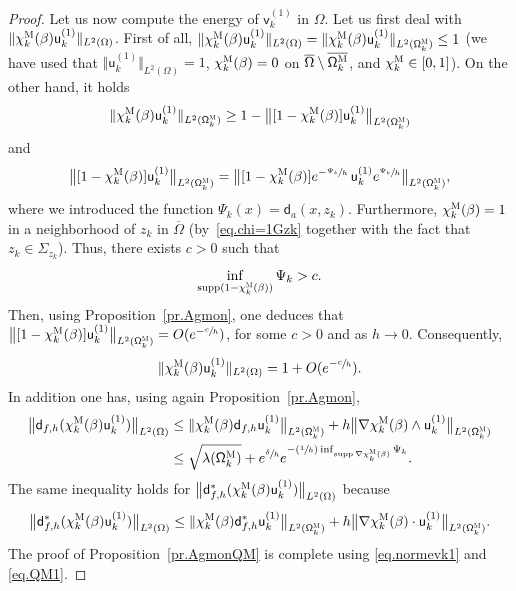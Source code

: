 \documentclass[10pt]{amsart}
\newcommand{\Psfrac}[2]{(\sfrac{#1}{#2})}
\DeclareMathOperator\supp{supp}
\theoremstyle{plain}
\theoremstyle{definition}
\begin{document}
\begin{proof}
Let us now compute the energy of $\mathsf v_k^{(1)}$ in $\Omega$.
Let us first deal with $\Vert \chi_k^{\textsc{M}} (\beta)\mathsf u_k^{(1)}\Vert _{ L^2 (\Omega) }$. First of all, $\Vert \chi_k^{\textsc{M}} (\beta)\mathsf u_k^{(1)}\Vert _{ L^2 (\Omega) }=\Vert \chi_k^{\textsc{M}} (\beta)\mathsf u_k^{(1)}\Vert _{ L^2 (\mathsf \Omega^{\textsc{M}}_k) }\le 1$ (we have used that $\Vert \mathsf u_k^{(1)}\Vert _{ L^2 (\Omega) }= 1$, $\chi_k^{\textsc{M}} (\beta)=0$ on $\overline{\Omega}\setminus \overline{ \mathsf \Omega_k^{\textsc{M}}}$, and $\chi_k^{\textsc{M}}\in [0,1]$).
On the other hand, it holds
\[
\Vert \chi_k^{\textsc{M}} (\beta)\mathsf u_k^{(1)}\Vert _{ L^2 (\mathsf \Omega_k^{\textsc{M}}) } \ge 1- \big \Vert [1-\chi_k^{\textsc{M}} (\beta)]\mathsf u_k^{(1)}\big \Vert _{ L^2 (\mathsf \Omega_k^{\textsc{M}}) }
\]
and
\[
\big \Vert [1-\chi_k^{\textsc{M}} (\beta)]\mathsf u_k^{(1)}\big
\Vert _{ L^2 (\mathsf \Omega_k^{\textsc{M}}) } = \big \Vert
[1-\chi_k^{\textsc{M}} (\beta)]e^{-\sfrac{\Psi_k}{h}}\, \mathsf
u_k^{(1)}e^{\sfrac{\Psi_k}{h}}\big \Vert _{ L^2 (\mathsf
\Omega_k^{\textsc{M}}) },
\]
where we introduced the function $\Psi_k(x)=\mathsf d_a(x,z_k)$.
Furthermore, $\chi_k^{\textsc{M}} (\beta)=1$ in a neighborhood of $z_k$ in $\overline \Omega$ (by~\eqref{eq.chi=1Gzk} together with the fact that $z_k\in \Sigma_{z_k}$). Thus, there exists $c>0$ such that
\[
\inf_{\text{supp}(1-\chi_k^{\textsc{M}} (\beta))} \Psi_k>c.
\]
Then, using Proposition~\ref{pr.Agmon}, one deduces that $\big \Vert [1-\chi_k^{\textsc{M}} (\beta)]\mathsf u_k^{(1)}\big \Vert _{ L^2 (\mathsf \Omega_k^{\textsc{M}}) }=O(e^{-\sfrac ch})$, for some $c>0$ and as $h\to 0$. Consequently,
\begin{align}\label{eq.normevk1}
\Vert \chi_k^{\textsc{M}} (\beta)\mathsf u_k^{(1)}\Vert _{ L^2 (\Omega) }=1+O(e^{-\sfrac ch}).
\end{align}
In addition one has, using again Proposition~\ref{pr.Agmon},
\begin{align*}
\big \| \mathsf d_{f,h} (\chi_k^{\textsc{M}} (\beta)\mathsf u_k^{(1)}) \big \|_{ L^{2} (\Omega)}&\le \| \chi_k^{\textsc{M}} (\beta) \mathsf d_{f,h} \mathsf u_k^{(1)} \big \|_{ L^{2} (\mathsf \Omega_k^{\textsc{M}})} + h \big \| \nabla \chi_k^{\textsc{M}} (\beta)\wedge \mathsf u_k^{(1)} \big \|_{ L^{2} (\mathsf \Omega_k^{\textsc{M}})}\\
&\le \sqrt {\lambda(\mathsf \Omega_k^{\textsc{M}})}+ e^{\sfrac \delta h} e^{-\Psfrac 1h \inf_{\supp \nabla \chi_k^{\textsc{M}} (\beta)} \Psi_k}.
\end{align*}
The same inequality holds for $\big \| \mathsf d^*_{f,h} (\chi_k^{\textsc{M}} (\beta)\mathsf u_k^{(1)}) \big \|_{ L^{2} (\Omega)}$ because
\[
\big \| \mathsf d^*_{f,h} (\chi_k^{\textsc{M}} (\beta)\mathsf u_k^{(1)}) \big \|_{ L^{2} (\Omega)}\le \| \chi_k^{\textsc{M}} (\beta) \mathsf d^*_{f,h} \mathsf u_k^{(1)} \big \|_{ L^{2} (\mathsf \Omega_k^{\textsc{M}})} + h \big \| \nabla \chi_k^{\textsc{M}} (\beta)\cdot\mathsf u_k^{(1)} \big \|_{ L^{2} (\mathsf \Omega_k^{\textsc{M}})}.
\]
The proof of Proposition~\ref{pr.AgmonQM} is complete using \eqref{eq.normevk1} and \eqref{eq.QM1}.
\end{proof}
\end{document}
